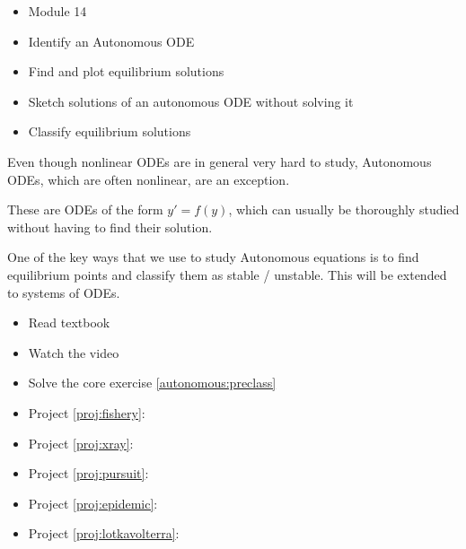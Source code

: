 \begin{lesson}

	\begin{itemize}
		\item Module 14
	\end{itemize}

	\begin{itemize}
		\item Identify an Autonomous ODE
		\item Find and plot equilibrium solutions
		\item Sketch solutions of an autonomous ODE without solving it
		\item Classify equilibrium solutions
	\end{itemize}
	

Even though nonlinear ODEs are in general very hard to study, Autonomous ODEs, which are often nonlinear, are an exception. 

These are ODEs of the form $y'=f(y)$, which can usually be thoroughly studied without having to find their solution. 

One of the key ways that we use to study Autonomous equations is to find equilibrium points and classify them as stable / unstable.
This will be extended to systems of ODEs.


\begin{itemize}
	\item Read textbook
	\item Watch the video
	\item Solve the core exercise \ref{autonomous:preclass}
\end{itemize}

\begin{itemize}
	\item Project \ref{proj:fishery}: \fisherytitle
	\item Project \ref{proj:xray}: \xraytitle
	\item Project \ref{proj:pursuit}: \pursuittitle
	\item Project \ref{proj:epidemic}: \epidemictitle
	\item Project \ref{proj:lotkavolterra}: \lotkavolterratitle
\end{itemize}


\end{lesson}


